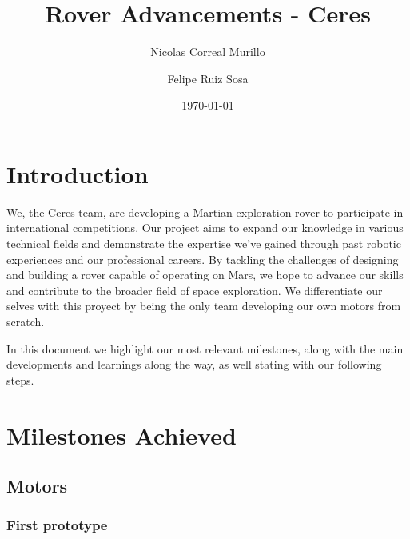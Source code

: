 \documentclass{article}
\title{Rover Advancements - Ceres}
\author{Nicolas Correal Murillo \and Felipe Ruiz Sosa}
\date{\today}
\begin{document}
\maketitle

\section*{Introduction}
We, the Ceres team, are developing a Martian exploration rover to participate in international competitions.
Our project aims to expand our knowledge in various technical fields and demonstrate the expertise we've gained
 through past robotic experiences and our professional careers. By tackling the challenges of designing and 
 building a rover capable of operating on Mars, we hope to advance our skills and contribute to the broader 
 field of space exploration. We differentiate our selves with this proyect by being the only team developing our own motors from scratch.


In this document we highlight our most relevant milestones, along with the main developments and learnings along the way, as well stating with our following steps.

\tableofcontents

\section{Milestones Achieved}
 \subsection{Motors}

 \subsubsection{First prototype}
\end{document}
